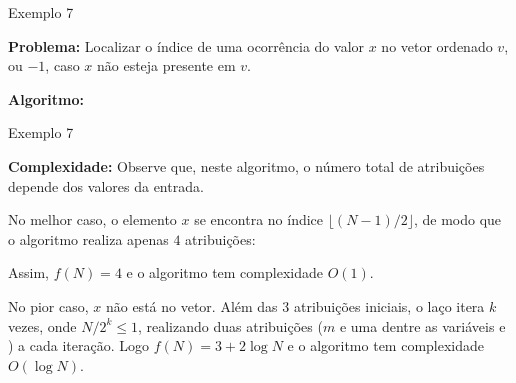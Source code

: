 \begin{frame}[fragile]{Exemplo 7}

	{\bf Problema:} Localizar o índice de uma ocorrência do valor $x$ no vetor ordenado
        $v$, ou $-1$, caso $x$ não esteja presente em $v$.

    {\bf Algoritmo:} 

\end{frame}

\begin{frame}[fragile]{Exemplo 7}

    {\bf Complexidade:} Observe que, neste algoritmo, o número total de atribuições depende
    dos valores da entrada.

    No melhor caso, o elemento $x$ se encontra no índice $\lfloor (N - 1)/2\rfloor$, de modo que
    o algoritmo realiza apenas $4$ atribuições:
    \begin{center} 
    \end{center}

    Assim, $f(N) = 4$ e o algoritmo tem complexidade $O(1)$.

    No pior caso, $x$ não está no vetor. Além das 3 atribuições iniciais, o laço itera $k$ vezes, 
    onde $N/2^k \leq 1$, realizando duas atribuições ($m$ e uma dentre as variáveis  e
    ) a cada iteração. Logo $f(N) = 3 + 2\log N$ e o algoritmo tem complexidade 
    $O(\log N)$.

\end{frame}
